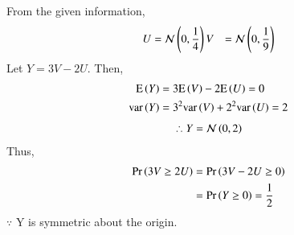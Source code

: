 From the given information,
\begin{align}
    U &= \mathcal{N}\left({0}, {\frac{1}{4}} \right)
    V &= \mathcal{N}\left({0}, {\frac{1}{9}} \right)
\end{align}
%
Let $Y = 3V - 2U$.  Then, 
\begin{align}
   \text{E}\left( Y \right) &= 3\text{E}\left( V \right) - 2\text{E}\left( U \right) = 0
\\
\text{var}\left( Y \right) &= 3^2\text{var}\left( V \right) + 2^2\text{var}\left( U \right) = 2
\end{align}
\begin{align}
    \therefore Y = \mathcal{N}\left({0}, {2} \right)
\end{align}
Thus, 
\begin{align}
    \Pr\left(3V \geq 2U\right) &= \Pr\left(3V-2U \geq 0\right)
    \\
    &= \Pr\left(Y \geq 0\right) = \frac{1}{2}
\end{align}
$\because$ Y is symmetric about the origin.
